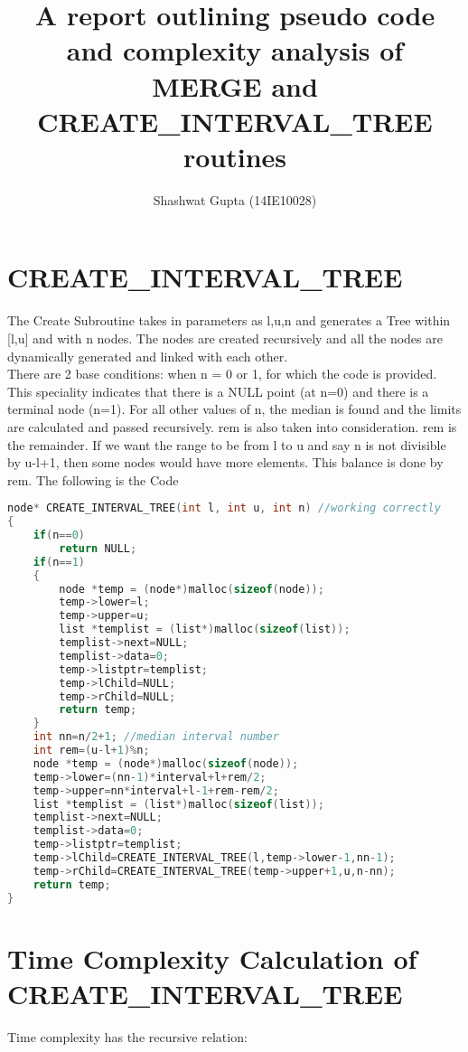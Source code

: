 \documentclass{article}
\title{A report outlining pseudo code and complexity analysis of MERGE and CREATE\_INTERVAL\_TREE routines}
\author{Shashwat Gupta (14IE10028)}
\begin{document}
\maketitle

\section{CREATE\_INTERVAL\_TREE}

The Create Subroutine takes in parameters as l,u,n and generates a Tree within [l,u] and with n nodes. The nodes are created recursively and all the nodes are dynamically generated and linked with each other.\\
There are 2 base conditions: when n = 0 or 1, for which the code is provided. This speciality indicates that there is a NULL point (at n=0) and there is a terminal node (n=1).
For all other values of n, the median is found and the limits are calculated and passed recursively.
rem is also taken into consideration. rem is the remainder. If we want the range to be from l to u and say n is not divisible by u-l+1, then some nodes would have more elements. This balance is done by rem.
The following is the Code
\begin{lstlisting}[language=c, caption=elimin\_solve]
node* CREATE_INTERVAL_TREE(int l, int u, int n) //working correctly
{
    if(n==0)
        return NULL;
    if(n==1)
    {
        node *temp = (node*)malloc(sizeof(node));
        temp->lower=l;
        temp->upper=u;
        list *templist = (list*)malloc(sizeof(list));
        templist->next=NULL;
        templist->data=0;
        temp->listptr=templist;
        temp->lChild=NULL;
        temp->rChild=NULL;
        return temp;
    }
    int nn=n/2+1; //median interval number
    int rem=(u-l+1)%n;
    node *temp = (node*)malloc(sizeof(node));
    temp->lower=(nn-1)*interval+l+rem/2;
    temp->upper=nn*interval+l-1+rem-rem/2;
    list *templist = (list*)malloc(sizeof(list));
    templist->next=NULL;
    templist->data=0;
    temp->listptr=templist;
    temp->lChild=CREATE_INTERVAL_TREE(l,temp->lower-1,nn-1);
    temp->rChild=CREATE_INTERVAL_TREE(temp->upper+1,u,n-nn);
    return temp;
}
\end{lstlisting}

\section{Time Complexity Calculation of CREATE\_INTERVAL\_TREE}

Time complexity has the recursive relation:
\end{document}
